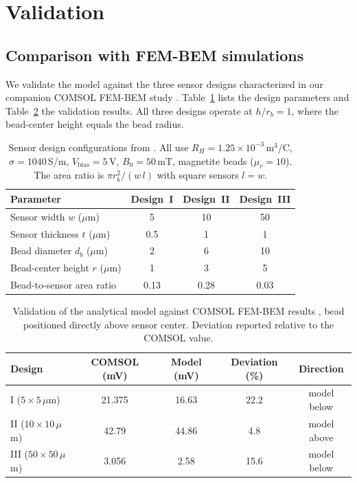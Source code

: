 \documentclass[pdflatex,sn-basic]{sn-jnl}
\theoremstyle{thmstyleone}
\theoremstyle{thmstyletwo}
\theoremstyle{thmstylethree}
\begin{document}
\section{Validation}\label{sec:validation}

\subsection{Comparison with FEM-BEM simulations}\label{sec:femvalidation}

We validate the model against the three sensor designs characterized in our companion COMSOL FEM-BEM study \citep{govindaraju2025}. Table~\ref{tab:designs} lists the design parameters and Table~\ref{tab:validation} the validation results. All three designs operate at $h/r_b = 1$, where the bead-center height equals the bead radius.

\begin{table}[!htbp]
\caption{Sensor design configurations from \citet{govindaraju2025}. All use $R_H = 1.25\times10^{-3}$\,m$^3$/C, $\sigma = 1040$\,S/m, $V_{\text{bias}} = 5$\,V, $B_0 = 50$\,mT, magnetite beads ($\mu_r = 10$). The area ratio is $\pi r_b^2/(w\,l)$ with square sensors $l = w$.}
\label{tab:designs}
\centering
\footnotesize
\begin{tabular}{@{}lccc@{}}
\toprule
Parameter & Design~I & Design~II & Design~III \\
\midrule
Sensor width $w$ ($\mu$m) & 5 & 10 & 50 \\
Sensor thickness $t$ ($\mu$m) & 0.5 & 1 & 1 \\
Bead diameter $d_b$ ($\mu$m) & 2 & 6 & 10 \\
Bead-center height $r$ ($\mu$m) & 1 & 3 & 5 \\
Bead-to-sensor area ratio & 0.13 & 0.28 & 0.03 \\
\bottomrule
\end{tabular}
\end{table}

\begin{table}[!htbp]
\caption{Validation of the analytical model against COMSOL FEM-BEM results \citep{govindaraju2025}, bead positioned directly above sensor center. Deviation reported relative to the COMSOL value.}
\label{tab:validation}
\centering
\footnotesize
\begin{tabular}{@{}lcccc@{}}
\toprule
Design & COMSOL (mV) & Model (mV) & Deviation (\%) & Direction \\
\midrule
I ($5\times5$\,$\mu$m) & 21.375 & 16.63 & 22.2 & model below \\
II ($10\times10$\,$\mu$m) & 42.79 & 44.86 & 4.8 & model above \\
III ($50\times50$\,$\mu$m) & 3.056 & 2.58 & 15.6 & model below \\
\bottomrule
\end{tabular}
\end{table}
\end{document}
